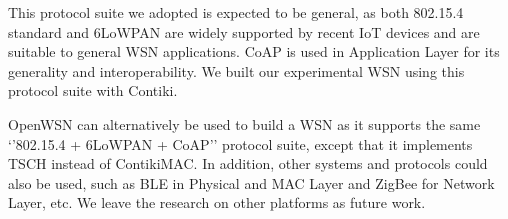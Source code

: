 This protocol suite we adopted is expected to be general, as both 802.15.4 standard and 6LoWPAN are widely supported by recent IoT devices and are suitable to general WSN applications. CoAP is used in Application Layer for its generality and interoperability. We built our experimental WSN using this protocol suite with Contiki\cite{Contiki}.

OpenWSN\cite{OpenWSN} can alternatively be used to build a WSN as it supports the same ‘’802.15.4 + 6LoWPAN + CoAP’’ protocol suite, except that it implements TSCH instead of ContikiMAC. In addition, other systems and protocols could also be used, such as BLE\cite{BLE} in Physical and MAC Layer and ZigBee for Network Layer, etc. We leave the research on other platforms as future work.